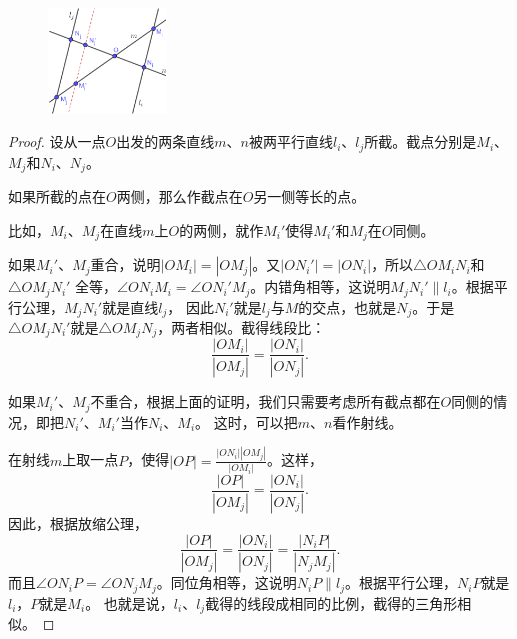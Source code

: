 \documentclass[12pt,UTF8]{ctexbook}
\begin{document}
\begin{figure} %
    \vspace{-10pt}
    \begin{flushright}
        \includegraphics[width=0.28\textwidth]{tu/相似2.png}
    \end{flushright}
\end{figure}

\begin{proof}
    设从一点$O$出发的两条直线$m$、$n$被两平行直线$l_i$、$l_j$所截。截点分别是$M_i$、$M_j$和$N_i$、$N_j$。
    
    如果所截的点在$O$两侧，那么作截点在$O$另一侧等长的点。

    比如，$M_i$、$M_j$在直线$m$上$O$的两侧，就作$M_i'$使得$M_i'$和$M_j$在$O$同侧。

    如果$M_i'$、$M_j$重合，说明$|OM_i| = |OM_j|$。又$|ON_i'| = |ON_i|$，所以$\triangle OM_iN_i$和$\triangle OM_jN_i'$
    全等，$\angle ON_iM_i = \angle ON_i'M_j$。内错角相等，这说明$M_jN_i' \parallel l_i$。根据平行公理，$M_jN_i'$就是直线$l_j$，
    因此$N_i'$就是$l_j$与$M$的交点，也就是$N_j$。于是$\triangle OM_jN_i'$就是$\triangle OM_jN_j$，两者相似。截得线段比：
    $$ \frac{|OM_i|}{|OM_j|} = \frac{|ON_i|}{|ON_j|}.$$

    如果$M_i'$、$M_j$不重合，根据上面的证明，我们只需要考虑所有截点都在$O$同侧的情况，即把$N_i'$、$M_i'$当作$N_i$、$M_i$。
    这时，可以把$m$、$n$看作射线。

    在射线$m$上取一点$P$，使得$|OP| = \frac{|ON_i||OM_j|}{|OM_i|}$。这样，
    $$ \frac{|OP|}{|OM_j|} = \frac{|ON_i|}{|ON_j|}.$$
    因此，根据放缩公理，
    $$ \frac{|OP|}{|OM_j|} = \frac{|ON_i|}{|ON_j|} = \frac{|N_iP|}{|N_jM_j|}.$$
    而且$\angle ON_iP = \angle ON_jM_j$。同位角相等，这说明$N_iP \parallel l_j$。根据平行公理，$N_iP$就是$l_i$，$P$就是$M_i$。
    也就是说，$l_i$、$l_j$截得的线段成相同的比例，截得的三角形相似。

\end{proof}
\end{document}

